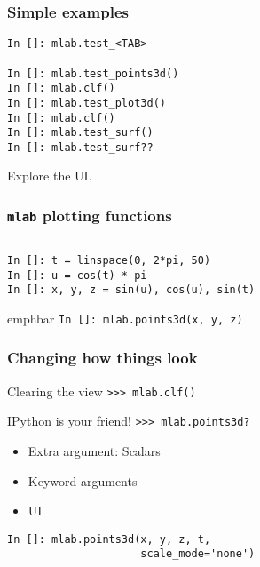 \documentclass[14pt,compress]{beamer}
\newcommand{\emphbar}[1]
{\begin{beamercolorbox}[rounded=true]{emphbar} 
      {#1}
 \end{beamercolorbox}
}
\newcommand{\typ}[1]{\lstinline{#1}}
\newcommand{\myemph}[1]{\structure{\emph{#1}}}
\newcommand{\PythonCode}[1]{\lstinline{#1}}
\begin{document}
\begin{frame}[fragile]
    \frametitle{Simple examples}

    \myemph{\Large Try these}

    \begin{lstlisting}
In []: mlab.test_<TAB>

In []: mlab.test_points3d()
In []: mlab.clf()
In []: mlab.test_plot3d()
In []: mlab.clf()
In []: mlab.test_surf()
In []: mlab.test_surf??
    \end{lstlisting}
Explore the UI.
\end{frame}


\begin{frame}[fragile]
    \frametitle{\typ{mlab} plotting functions}
    \begin{columns}
        \myemph{\Large 0D data}
    \end{columns}

    \begin{lstlisting}
In []: t = linspace(0, 2*pi, 50)
In []: u = cos(t) * pi
In []: x, y, z = sin(u), cos(u), sin(t)
    \end{lstlisting}
    \emphbar{\PythonCode{In []: mlab.points3d(x, y, z)}}
\end{frame}

\begin{frame}
    \frametitle{Changing how things look}

    \begin{block}{Clearing the view}
    \PythonCode{>>> mlab.clf()}
    \end{block}

    \pause

    \begin{block}{IPython is your friend!}
    \PythonCode{>>> mlab.points3d?}

    \begin{itemize}

        \item Extra argument: Scalars

        \item Keyword arguments

        \item UI
    \end{itemize}
    \end{block}
\pause
    \begin{lstlisting}
In []: mlab.points3d(x, y, z, t, 
                     scale_mode='none')
    \end{lstlisting}

\end{frame}
\end{document}
